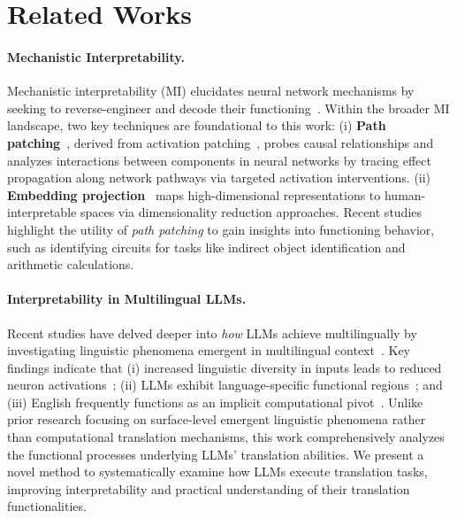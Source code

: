 \section{Related Works}
\paragraph{Mechanistic Interpretability.}
Mechanistic interpretability (MI) elucidates neural network mechanisms by seeking to reverse-engineer and decode their functioning~\citep{NEURIPS2022_6f1d43d5,lan2024sparseautoencodersrevealuniversal,10.1145/3639372,rai2024practicalreviewmechanisticinterpretability}.
Within the broader MI landscape, two key techniques are foundational to this work: (i) \textbf{Path patching}~\citep{goldowsky2023localizing,wang2023interpretability}, derived from activation patching~\citep{heimersheim2024useinterpretactivationpatching,zhang2024towards}, probes causal relationships and analyzes interactions between components in neural networks by tracing effect propagation along network pathways via targeted activation interventions.
(ii) \textbf{Embedding projection}~\citep{geva-etal-2022-transformer,dar-etal-2023-analyzing} maps high-dimensional representations to human-interpretable spaces via dimensionality reduction approaches. 
Recent studies highlight the utility of \textit{path patching} to gain insights into functioning behavior, such as identifying circuits for tasks like indirect object identification\citep{wang2023interpretability} and arithmetic calculations\citep{wei2024interpreting}.


\paragraph{Interpretability in Multilingual LLMs.}

Recent studies have delved deeper into \textit{how} LLMs achieve multilingually by investigating linguistic phenomena emergent in multilingual context~\citep{bhattacharya2024understandingroleffnsdriving, peng-sogaard-2024-concept, ferrando-costa-jussa-2024-similarity, dumas2024how}. Key findings indicate that (i) increased linguistic diversity in inputs leads to reduced neuron activations~\citep{mu-etal-2024-revealing}; (ii) LLMs exhibit language-specific functional regions~\citep{tang-etal-2024-language}; and (iii) English frequently functions as an implicit computational pivot~\citep{wendler-etal-2024-llamas,zhao2024how}. 
Unlike prior research focusing on surface-level emergent linguistic phenomena rather than computational translation mechanisms, this work comprehensively analyzes the functional processes underlying LLMs’ translation abilities. We present a novel method to systematically examine how LLMs execute translation tasks, improving interpretability and practical understanding of their translation functionalities.